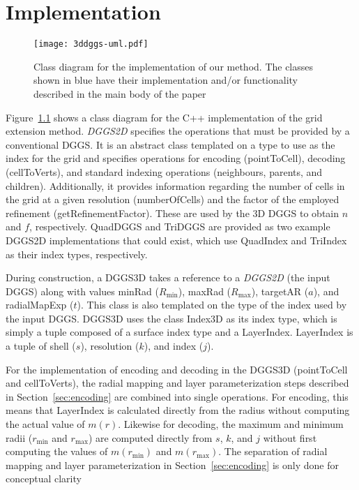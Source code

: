 \chapter{Implementation}

\begin{figure}[h]
	\centering
	\texttt{[image: 3ddggs-uml.pdf]}
	\caption{Class diagram for the implementation of our method. The classes shown in blue have their implementation and/or functionality described in the main body of the paper}
	\label{fig:uml}
\end{figure}

Figure~\ref{fig:uml} shows a class diagram for the C++ implementation of the grid extension method. \textit{DGGS2D} specifies the operations that must be provided by a conventional DGGS. It is an abstract class templated on a type to use as the index for the grid and specifies operations for encoding (pointToCell), decoding (cellToVerts), and standard indexing operations (neighbours, parents, and children). Additionally, it provides information regarding the number of cells in the grid at a given resolution (numberOfCells) and the factor of the employed refinement (getRefinementFactor). These are used by the 3D DGGS to obtain $n$ and $f$, respectively. QuadDGGS and TriDGGS are provided as two example DGGS2D implementations that could exist, which use QuadIndex and TriIndex as their index types, respectively.

During construction, a DGGS3D takes a reference to a \textit{DGGS2D} (the input DGGS) along with values minRad ($R_\mathrm{min}$), maxRad ($R_\mathrm{max}$), targetAR ($a$), and radialMapExp ($t$). This class is also templated on the type of the index used by the input DGGS. DGGS3D uses the class Index3D as its index type, which is simply a tuple composed of a surface index type and a LayerIndex. LayerIndex is a tuple of shell ($s$), resolution ($k$), and index ($j$).

For the implementation of encoding and decoding in the DGGS3D (pointToCell and cellToVerts), the radial mapping and layer parameterization steps described in Section~\ref{sec:encoding} are combined into single operations. For encoding, this means that LayerIndex is calculated directly from the radius without computing the actual value of $m(r)$. Likewise for decoding, the maximum and minimum radii ($r_\mathrm{min}$ and $r_\mathrm{max}$) are computed directly from $s$, $k$, and $j$ without first computing the values of $m(r_\mathrm{min})$ and $m(r_\mathrm{max})$. The separation of radial mapping and layer parameterization in Section~\ref{sec:encoding} is only done for conceptual clarity